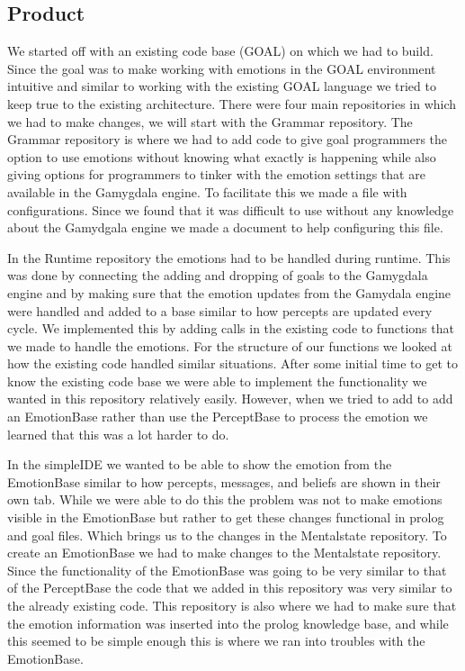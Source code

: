\documentclass[11pt]{article}
\begin{document}
\subsection{Product}
We started off with an existing code base (GOAL) on which we had to build. Since the goal was to make working with emotions in the GOAL environment intuitive and similar to working with the existing GOAL language we tried to keep true to the existing architecture. There were four main repositories in which we had to make changes, we will start with the Grammar repository.
The Grammar repository is where we had to add code to give goal programmers the option to use emotions without knowing what exactly is happening while also giving options for programmers to tinker with the emotion settings that are available in the Gamygdala engine. To facilitate this we made a file with configurations. Since we found that it was difficult to use without any knowledge about the Gamydgala engine we made a document to help configuring this file.\par 
In the Runtime repository the emotions had to be handled during runtime. This was done by connecting the adding and dropping of goals to the Gamygdala engine and by making sure that the emotion updates from the Gamydala engine were handled and added to a base similar to how percepts are updated every cycle. We implemented this by adding calls in the existing code to functions that we made to handle the emotions. For the structure of our functions we looked at how the existing code handled similar situations. After some initial time to get to know the existing code base we were able to implement the functionality we wanted in this repository relatively easily. However, when we tried to add to add an EmotionBase rather than use the PerceptBase to process the emotion we learned that this was a lot harder to do. \par 
In the simpleIDE we wanted to be able to show the emotion from the EmotionBase similar to how percepts, messages, and beliefs are shown in their own tab. While we were able to do this the problem was not to make emotions visible in the EmotionBase but rather to get these changes functional in prolog and goal files. Which brings us to the changes in the Mentalstate repository.
To create an EmotionBase we had to make changes to the Mentalstate repository. Since the functionality of the EmotionBase was going to be very similar to that of the PerceptBase the code that we added in this repository was very similar to the already existing code. This repository is also where we had to make sure that the emotion information was inserted into the prolog knowledge base, and while this seemed to be simple enough this is where we ran into troubles with the EmotionBase. \par 
\end{document}
